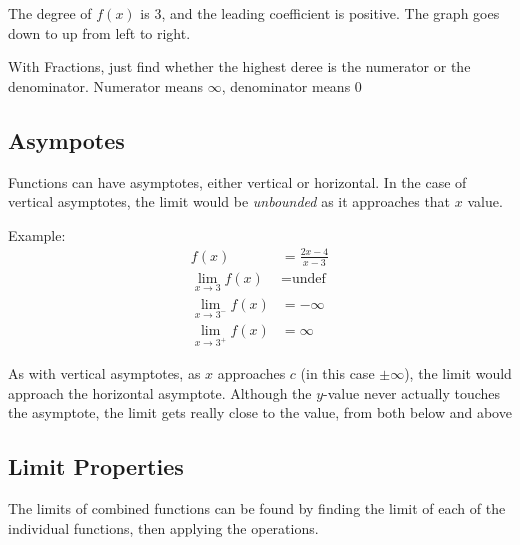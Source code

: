 \documentclass[12pt]{article}
\newcommand{\uit}[1]{\textit{#1}}
\begin{document}
    The degree of $f(x)$ is 3, and the leading coefficient is positive. The graph
    goes down to up from left to right.

    With Fractions, just find whether the highest deree is the numerator or the denominator. 
    Numerator means $\infty$, denominator means $0$

    \subsection{Asympotes}
    Functions can have asymptotes, either vertical or horizontal. In the case of vertical asymptotes, the limit
    would be \uit{unbounded} as it approaches that $x$ value. 

    \noindent Example:
    \[
        \begin{aligned}
            f(x) &= \frac{2x-4}{x-3}\\
            \lim_{x \to 3} f(x) &= \text{undef} \\
            \lim_{x \to 3^-} f(x) &= -\infty \\
            \lim_{x \to 3^+} f(x) &= \infty 
        \end{aligned}
    \]

    As with vertical asymptotes, as $x$ approaches $c$ (in this case $\pm\infty$), the limit would
    approach the horizontal asymptote. Although the $y$-value never actually touches the 
    asymptote, the limit gets really close to the value, from both below and above

    \subsection{Limit Properties}

    The limits of combined functions can be found by finding the limit of each of the 
    individual functions, then applying the operations.
\end{document}
